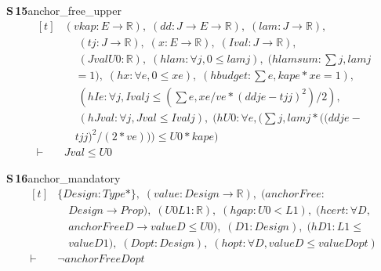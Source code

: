 \documentclass[conference]{IEEEtran}
\theoremstyle{definition}
\newcommand{\lean}[1]{\textsf{\footnotesize #1}}
\begin{document}
\noindent\textbf{S\,15}\quad\lean{anchor\_free\_upper}
{\footnotesize\[ \begin{aligned}[t]
&(\mathit{v} \mathit{kap} : \mathit{E} \to \mathbb{R} ),\; (\mathit{dd} : \mathit{J} \to \mathit{E} \to \mathbb{R} ),\; (\mathit{lam} : \mathit{J} \to \mathbb{R} ),\\
&\quad \; (\mathit{tj} : \mathit{J} \to \mathbb{R} ),\; (\mathit{x} : \mathit{E} \to \mathbb{R} ),\; (\mathit{Ival} : \mathit{J} \to \mathbb{R} ),\\
&\quad \; (\mathit{Jval} \mathit{U0} : \mathbb{R} ),\; (\mathit{hlam} : \forall \mathit{j}, 0 \leq \mathit{lam} \mathit{j}),\; (\mathit{hlamsum} : \textstyle\sum \mathit{j}, \mathit{lam} \mathit{j}\\
&\quad = 1),\; (\mathit{hx} : \forall \mathit{e}, 0 \leq \mathit{x} \mathit{e}),\; (\mathit{hbudget} : \textstyle\sum \mathit{e}, \mathit{kap} \mathit{e} * \mathit{x} \mathit{e} = 1),\\
&\quad \; (\mathit{hIe} : \forall \mathit{j}, \mathit{Ival} \mathit{j} \leq (\textstyle\sum \mathit{e}, \mathit{x} \mathit{e} / \mathit{v} \mathit{e} * (\mathit{dd} \mathit{j} \mathit{e} - \mathit{tj} \mathit{j}) ^{2}) / 2),\\
&\quad \; (\mathit{hJval} : \forall \mathit{j}, \mathit{Jval} \leq \mathit{Ival} \mathit{j}),\; (\mathit{hU0} : \forall \mathit{e}, (\textstyle\sum \mathit{j}, \mathit{lam} \mathit{j} * ((\mathit{dd} \mathit{j} \mathit{e} -\\
&\quad \mathit{tj} \mathit{j}) ^{2} / (2 * \mathit{v} \mathit{e}))) \leq \mathit{U0} * \mathit{kap} \mathit{e})\\
\vdash\;&\mathit{Jval} \leq \mathit{U0}
\end{aligned} \]}

\noindent\textbf{S\,16}\quad\lean{anchor\_mandatory}
{\footnotesize\[ \begin{aligned}[t]
&\{ \mathit{Design} : \mathit{Type}*\},\; (\mathit{value} : \mathit{Design} \to \mathbb{R} ),\; (\mathit{anchorFree} :\\
&\quad \mathit{Design} \to \mathit{Prop}),\; (\mathit{U0} \mathit{L1} : \mathbb{R} ),\; (\mathit{hgap} : \mathit{U0} < \mathit{L1}),\; (\mathit{hcert} : \forall \mathit{D},\\
&\quad \mathit{anchorFree} \mathit{D} \to \mathit{value} \mathit{D} \leq \mathit{U0}),\; (\mathit{D1} : \mathit{Design}),\; (\mathit{hD1} : \mathit{L1} \leq\\
&\quad \mathit{value} \mathit{D1}),\; (\mathit{Dopt} : \mathit{Design}),\; (\mathit{hopt} : \forall \mathit{D}, \mathit{value} \mathit{D} \leq \mathit{value} \mathit{Dopt})\\
\vdash\;&\neg \mathit{anchorFree} \mathit{Dopt}
\end{aligned} \]}
\end{document}
